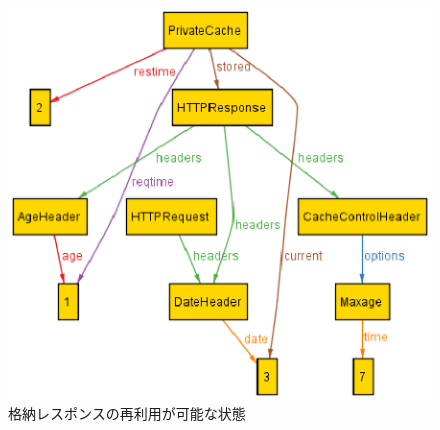 \documentclass{css}
\begin{document}
\begin{figure}[htb]
\centering
\includegraphics[width=1.0\hsize]{case1.eps}
\caption{格納レスポンスの再利用が可能な状態}
\label{fig:case1}
\end{figure}
\end{document}
